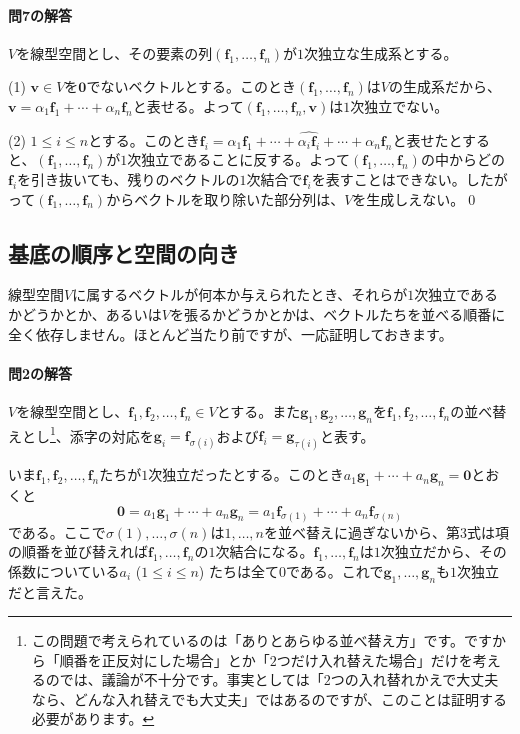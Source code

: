 \paragraph{問7の解答} $V$を線型空間とし、その要素の列$(\bm{f}_1, \ldots, \bm{f}_n)$が$1$次独立な生成系とする。

\noindent (1) $\bm{v} \in V$を$\bm{0}$でないベクトルとする。このとき$(\bm{f}_1, \ldots, \bm{f}_n)$は$V$の生成系だから、$\bm{v} = \alpha_1 \bm{f}_1 + \cdots + \alpha_n \bm{f}_n$と表せる。よって$(\bm{f}_1, \ldots, \bm{f}_n, \bm{v})$は$1$次独立でない。

\noindent (2) $1\leq i \leq n$とする。このとき$\bm{f}_i = \alpha_1 \bm{f}_1 + \cdots + \hat{\alpha_i \bm{f}_i} + \cdots + \alpha_n \bm{f}_n$と表せたとすると、$(\bm{f}_1, \ldots, \bm{f}_n)$が$1$次独立であることに反する。よって$(\bm{f}_1, \ldots, \bm{f}_n)$の中からどの$\bm{f}_i$を引き抜いても、残りのベクトルの$1$次結合で$\bm{f}_i$を表すことはできない。したがって$(\bm{f}_1, \ldots, \bm{f}_n)$からベクトルを取り除いた部分列は、$V$を生成しえない。\qed


\subsection{基底の順序と空間の向き}

線型空間$V$に属するベクトルが何本か与えられたとき、それらが$1$次独立であるかどうかとか、あるいは$V$を張るかどうかとかは、ベクトルたちを並べる順番に全く依存しません。ほとんど当たり前ですが、一応証明しておきます。

\paragraph{問2の解答} $V$を線型空間とし、$\bm{f}_1, \bm{f}_2, \ldots, \bm{f}_n \in V$とする。また$\bm{g}_1, \bm{g}_2, \ldots, \bm{g}_n$を$\bm{f}_1, \bm{f}_2, \ldots, \bm{f}_n$の並べ替えとし\footnote{この問題で考えられているのは「ありとあらゆる並べ替え方」です。ですから「順番を正反対にした場合」とか「$2$つだけ入れ替えた場合」だけを考えるのでは、議論が不十分です。事実としては「$2$つの入れ替れかえで大丈夫なら、どんな入れ替えでも大丈夫」ではあるのですが、このことは証明する必要があります。}、添字の対応を$\bm{g}_i = \bm{f}_{\sigma(i)}$および$\bm{f}_i = \bm{g}_{\tau(i)}$と表す。

いま$\bm{f}_1, \bm{f}_2, \ldots, \bm{f}_n$たちが$1$次独立だったとする。このとき$a_1 \bm{g}_1 + \cdots + a_n \bm{g}_n = \bm{0}$とおくと
\[
\bm{0} = a_1 \bm{g}_1 + \cdots + a_n \bm{g}_n = a_1 \bm{f}_{\sigma(1)} + \cdots + a_n \bm{f}_{\sigma(n)}
\]
である。ここで$\sigma(1),\ldots,\sigma(n)$は$1,\ldots,n$を並べ替えに過ぎないから、第$3$式は項の順番を並び替えれば$\bm{f}_1, \ldots, \bm{f}_n$の$1$次結合になる。$\bm{f}_1, \ldots, \bm{f}_n$は$1$次独立だから、その係数についている$a_i$ ($1\leq i\leq n$) たちは全て$0$である。これで$\bm{g}_1, \ldots, \bm{g}_n$も$1$次独立だと言えた。

